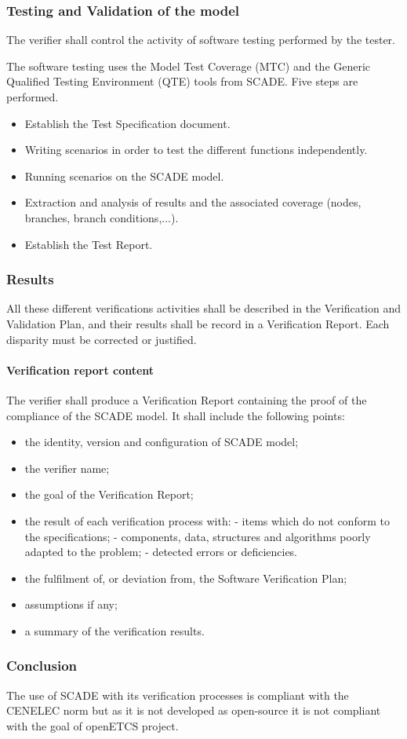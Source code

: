 \subsubsection{Testing and Validation of the model}

The verifier shall control the activity of software testing performed by the tester.

The software testing uses the Model Test Coverage (MTC) and the Generic Qualified Testing Environment (QTE) tools from SCADE. Five steps are performed.
\begin{itemize}
\item Establish the Test Specification document.
\item Writing scenarios in order to test the different functions independently.
\item Running scenarios on the SCADE model.
\item Extraction and analysis of results and the associated coverage (nodes, branches, branch conditions,...).
\item Establish the Test Report.
\end{itemize}

\subsubsection{Results}

All these different verifications activities shall be described in the Verification and Validation Plan, and their results shall be record in a Verification Report. Each disparity must be corrected or justified.

\paragraph{Verification report content}

The verifier shall produce a Verification Report containing the proof of the compliance of the SCADE model. It shall include the following points:
\begin{itemize}
\item the identity, version and configuration of SCADE model;
\item the verifier name;
\item the goal of the Verification Report;
\item the result of each verification process with:
\subitem - items which do not conform to the specifications;
\subitem - components, data, structures and algorithms poorly adapted to the problem;
\subitem - detected errors or deficiencies.
\item the fulfilment of, or deviation from, the Software Verification Plan;
\item assumptions if any;
\item a summary of the verification results.
\end{itemize}

\subsubsection{Conclusion}

The use of SCADE with its verification processes is compliant with the CENELEC norm but as it is not developed as open-source it is not compliant with the goal of openETCS project. 